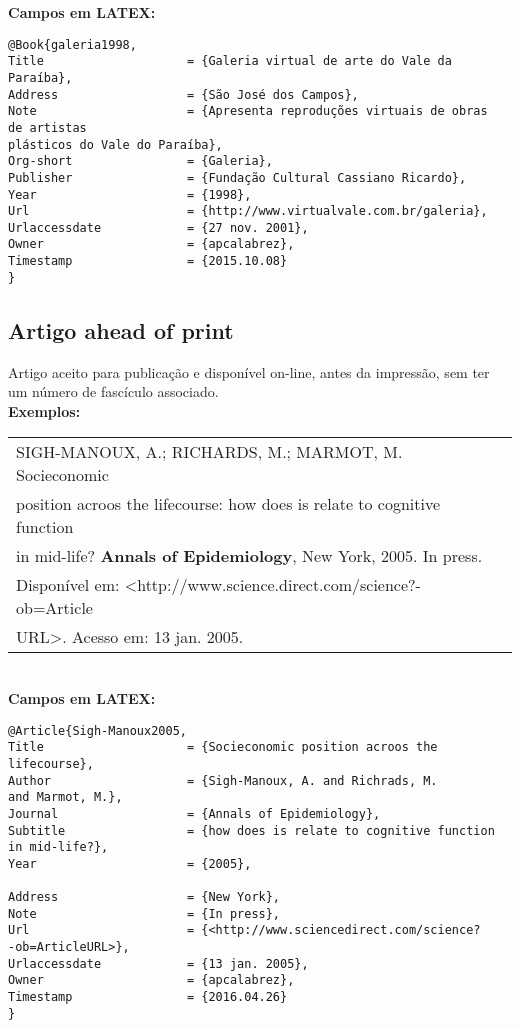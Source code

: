 \textbf{Campos em LATEX:} 

\begin{verbatim}
@Book{galeria1998,
Title                    = {Galeria virtual de arte do Vale da 
Paraíba},
Address                  = {São José dos Campos},
Note                     = {Apresenta reproduções virtuais de obras
de artistas 
plásticos do Vale do Paraíba},
Org-short                = {Galeria},
Publisher                = {Fundação Cultural Cassiano Ricardo},
Year                     = {1998},
Url                      = {http://www.virtualvale.com.br/galeria},
Urlaccessdate            = {27 nov. 2001},
Owner                    = {apcalabrez},
Timestamp                = {2015.10.08}
}

\end{verbatim}
\subsection{Artigo ahead of print}

Artigo aceito para publicação e disponível on-line, antes da impressão,
sem ter um número de fascículo associado. \\

\textbf{Exemplos:} \\

\begin{tabular}{|l|c|} \hline
SIGH-MANOUX, A.; RICHARDS, M.; MARMOT, M. Socieconomic
\\position acroos the lifecourse: how does is relate to cognitive function \\in
mid-life? \textbf{Annals of Epidemiology}, New York, 2005. In press. \\Disponível
em: <http://www.science.direct.com/science?-ob=Article\\URL>. Acesso em: 13 jan. 2005. 
	\\\hline
\end{tabular} \\

\textbf{Campos em LATEX:} 

\begin{verbatim}
@Article{Sigh-Manoux2005,
Title                    = {Socieconomic position acroos the 
lifecourse},
Author                   = {Sigh-Manoux, A. and Richrads, M. 
and Marmot, M.},
Journal                  = {Annals of Epidemiology},
Subtitle                 = {how does is relate to cognitive function 
in mid-life?},
Year                     = {2005},

Address                  = {New York},
Note                     = {In press},
Url                      = {<http://www.sciencedirect.com/science?
-ob=ArticleURL>},
Urlaccessdate            = {13 jan. 2005},
Owner                    = {apcalabrez},
Timestamp                = {2016.04.26}
}
\end{verbatim}

